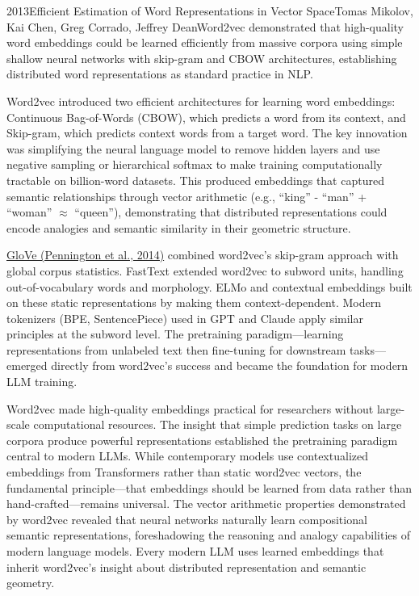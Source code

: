 
\begin{papersummary}{2013}{Efficient Estimation of Word Representations in Vector Space}{Tomas Mikolov, Kai Chen, Greg Corrado, Jeffrey Dean}{Word2vec demonstrated that high-quality word embeddings could be learned efficiently from massive corpora using simple shallow neural networks with skip-gram and CBOW architectures, establishing distributed word representations as standard practice in NLP.}

Word2vec introduced two efficient architectures for learning word embeddings: Continuous Bag-of-Words (CBOW), which predicts a word from its context, and Skip-gram, which predicts context words from a target word. The key innovation was simplifying the neural language model to remove hidden layers and use negative sampling or hierarchical softmax to make training computationally tractable on billion-word datasets. This produced embeddings that captured semantic relationships through vector arithmetic (e.g., ``king'' - ``man'' + ``woman'' $\approx$ ``queen''), demonstrating that distributed representations could encode analogies and semantic similarity in their geometric structure.

\hyperref[paper:pennington-2014]{GloVe (Pennington et al., 2014)} combined word2vec's skip-gram approach with global corpus statistics. FastText extended word2vec to subword units, handling out-of-vocabulary words and morphology. ELMo and contextual embeddings built on these static representations by making them context-dependent. Modern tokenizers (BPE, SentencePiece) used in GPT and Claude apply similar principles at the subword level. The pretraining paradigm—learning representations from unlabeled text then fine-tuning for downstream tasks—emerged directly from word2vec's success and became the foundation for modern LLM training.

Word2vec made high-quality embeddings practical for researchers without large-scale computational resources. The insight that simple prediction tasks on large corpora produce powerful representations established the pretraining paradigm central to modern LLMs. While contemporary models use contextualized embeddings from Transformers rather than static word2vec vectors, the fundamental principle—that embeddings should be learned from data rather than hand-crafted—remains universal. The vector arithmetic properties demonstrated by word2vec revealed that neural networks naturally learn compositional semantic representations, foreshadowing the reasoning and analogy capabilities of modern language models. Every modern LLM uses learned embeddings that inherit word2vec's insight about distributed representation and semantic geometry.

\end{papersummary}
